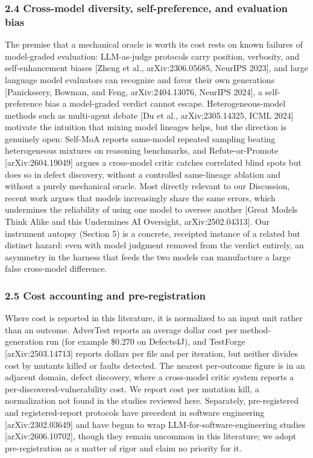\documentclass[
  11pt,
]{article}
\begin{document}
\subsubsection{2.4 Cross-model diversity, self-preference, and
evaluation
bias}\label{cross-model-diversity-self-preference-and-evaluation-bias}

The premise that a mechanical oracle is worth its cost rests on known
failures of model-graded evaluation: LLM-as-judge protocols carry
position, verbosity, and self-enhancement biases {[}Zheng et al.,
arXiv:2306.05685, NeurIPS 2023{]}, and large language model evaluators
can recognize and favor their own generations {[}Panickssery, Bowman,
and Feng, arXiv:2404.13076, NeurIPS 2024{]}, a self-preference bias a
model-graded verdict cannot escape. Heterogeneous-model methods such as
multi-agent debate {[}Du et al., arXiv:2305.14325, ICML 2024{]} motivate
the intuition that mixing model lineages helps, but the direction is
genuinely open: Self-MoA reports same-model repeated sampling beating
heterogeneous mixtures on reasoning benchmarks, and Refute-or-Promote
{[}arXiv:2604.19049{]} argues a cross-model critic catches correlated
blind spots but does so in defect discovery, without a controlled
same-lineage ablation and without a purely mechanical oracle. Most
directly relevant to our Discussion, recent work argues that models
increasingly share the same errors, which undermines the reliability of
using one model to oversee another {[}Great Models Think Alike and this
Undermines AI Oversight, arXiv:2502.04313{]}. Our instrument autopsy
(Section 5) is a concrete, receipted instance of a related but distinct
hazard: even with model judgment removed from the verdict entirely, an
asymmetry in the harness that feeds the two models can manufacture a
large false cross-model difference.

\subsubsection{2.5 Cost accounting and
pre-registration}\label{cost-accounting-and-pre-registration}

Where cost is reported in this literature, it is normalized to an input
unit rather than an outcome. AdverTest reports an average dollar cost
per method-generation run (for example \$0.270 on Defects4J), and
TestForge {[}arXiv:2503.14713{]} reports dollars per file and per
iteration, but neither divides cost by mutants killed or faults
detected. The nearest per-outcome figure is in an adjacent domain,
defect discovery, where a cross-model critic system reports a
per-discovered-vulnerability cost. We report cost per mutation kill, a
normalization not found in the studies reviewed here. Separately,
pre-registered and registered-report protocols have precedent in
software engineering {[}arXiv:2302.03649{]} and have begun to wrap
LLM-for-software-engineering studies {[}arXiv:2606.10702{]}, though they
remain uncommon in this literature; we adopt pre-registration as a
matter of rigor and claim no priority for it.
\end{document}
